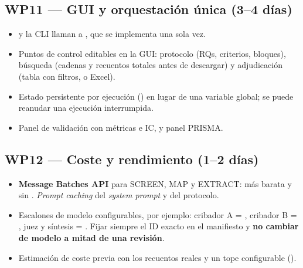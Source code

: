 \documentclass[11pt,a4paper]{article}
\newcommand{\WP}[1]{\textbf{\textcolor{palet}{WP#1}}}
\begin{document}
\subsection*{\WP{11} — GUI y orquestación única (3--4 días)}
\begin{itemize}
  \item {} y la CLI llaman a , que se implementa una sola vez.
  \item Puntos de control editables en la GUI: protocolo (RQs, criterios, bloques), búsqueda (cadenas y recuentos totales antes de descargar) y adjudicación (tabla con filtros, o Excel).
  \item Estado persistente por ejecución () en lugar de una variable global; se puede reanudar una ejecución interrumpida.
  \item Panel de validación con métricas e IC, y panel PRISMA.
\end{itemize}

\subsection*{\WP{12} — Coste y rendimiento (1--2 días)}
\begin{itemize}
  \item \textbf{Message Batches API} para SCREEN, MAP y EXTRACT: más barata y sin . \emph{Prompt caching} del \emph{system prompt} y del protocolo.
  \item Escalones de modelo configurables, por ejemplo: cribador A = , cribador B = , juez y síntesis = . Fijar siempre el ID exacto en el manifiesto y \textbf{no cambiar de modelo a mitad de una revisión}.
  \item Estimación de coste previa con los recuentos reales y un tope configurable ().
\end{itemize}

\end{document}
